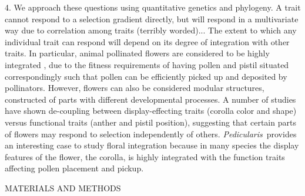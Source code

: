 \documentclass[12pt,letterpaper]{article}
\def\P{\emph{Pedicularis}}
\renewcommand{\section}[1]{%
\bigskip
\begin{center}
\begin{large}
\normalfont\scshape #1
\medskip
\end{large}
\end{center}}
\begin{document}
4. We approach these questions using quantitative genetics and phylogeny. 
A trait cannot respond to a selection gradient directly, but will respond in a multivariate way due to correlation among traits (terribly worded)... The extent to which any individual trait can respond will depend on its degree of integration with other traits. In particular, animal pollinated flowers are considered to be highly integrated \citep{...}, due to the fitness requirements of having pollen and pistil situated correspondingly such that pollen can be efficiently picked up and deposited by pollinators. However, flowers can also be considered modular structures, constructed of parts with different developmental processes. A number of studies have shown de-coupling between display-effecting traits (corolla color and shape) versus functional traits (anther and pistil position), suggesting that certain parts of flowers may respond to selection independently of others. 
\P~provides an interesting case to study floral integration because in many species the display features of the flower, the corolla, is highly integrated with the function traits affecting pollen placement and pickup. 

\citep{bolstad_genetic_2015}









\section{MATERIALS AND METHODS}
\end{document}
